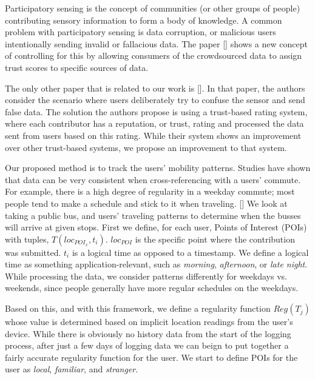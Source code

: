 \documentclass[10pt,twocolumn]{article}
\begin{document}
	    Participatory sensing is the concept of communities (or other groups of people) contributing sensory information to form a body of knowledge. %
	    A common problem with participatory sensing is data corruption, or malicious users intentionally sending invalid or fallacious data. The paper %
	    [] shows a new concept of controlling for this by allowing consumers of the crowdsourced data to assign trust scores to specific sources of data. 
	    
	    The only other paper that is related to our work is []. %
	    In that paper, the authors consider the scenario where users deliberately try to confuse the sensor and send false data. The solution the authors propose is using a trust-based rating system, where each contributor has a reputation, or trust, rating and processed the data sent from users based on this rating. While their system shows an improvement over other trust-based systems, we propose an improvement to that system.
	    
	    Our proposed method is to track the users' mobility patterns. Studies have shown that data can be very consistent when cross-referencing with a users' commute. For example, there is a high degree of regularity in a weekday commute; most people tend to make a schedule and stick to it when traveling. [] %
	    We look at taking a public bus, and users' traveling patterns to determine when the busses will arrive at given stops. First we define, for each user, Points of Interest (POIs) with tuples, $T(loc_{POI_x}, t_i)$. $loc_{POI}$ is the specific point where the contribution was submitted. $t_i$ is a logical time as opposed to a timestamp. We define a logical time as something application-relevant, such as \emph{morning}, \emph{afternoon}, or \emph{late night}.
	    While processing the data, we consider patterns differently for weekdays vs. weekends, since people generally have more regular schedules on the weekdays. %
	    
	    Based on this, and with this framework, we define a regularity function $Reg(T_j)$ whose value is determined based on implicit location readings from the user's device. %
	    While there is obviously no history data from the start of the logging process, after just a few days of logging data we can beign to put together a fairly accurate regularity function for the user. We start to define POIs for the user as \emph{local}, \emph{familiar}, and \emph{stranger}. 
	    
\end{document}
